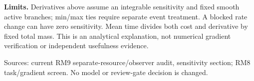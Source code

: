 \documentclass[11pt]{article}
\begin{document}
\textbf{Limits.} Derivatives above assume an integrable sensitivity and fixed
smooth active branches; min/max ties require separate event treatment. A
blocked rate change can have zero sensitivity. Mean time divides both cost and
derivative by fixed total mass. This is an analytical explanation, not numerical
gradient verification or independent usefulness evidence.

\small Sources: current RM9 separate-resource/observer audit, sensitivity
section; RM8 task/gradient screen.
No model or review-gate decision is changed.
\end{document}
